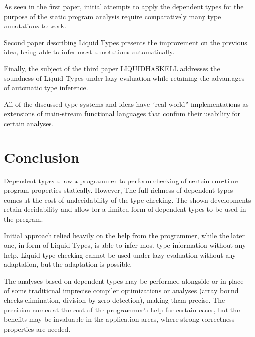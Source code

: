 \documentclass[a4paper,UKenglish]{lipics-v2016}
\begin{document}
As seen in the first paper, initial attempts to apply the dependent types for
the purpose of the static program analysis require comparatively many type
annotations to work.

Second paper describing Liquid Types presents the improvement on the previous
idea, being able to infer most annotations automatically.

Finally, the subject of the third paper LIQUIDHASKELL addresses the soundness
of Liquid Types under lazy evaluation while retaining the advantages of
automatic type inference.

All of the discussed type systems and ideas have ``real world'' implementations
as extensions of main-stream functional languages that confirm their usability
for certain analyses.

\section{Conclusion}

Dependent types allow a programmer to perform checking of certain run-time
program properties statically. However, The full richness of dependent types
comes at the cost of undecidability of the type checking. The shown
developments retain decidability and allow for a limited form of dependent
types to be used in the program.

Initial approach relied heavily on the help from the programmer, while the
later one, in form of Liquid Types, is able to infer most type information
without any help. Liquid type checking cannot be used under lazy evaluation
without any adaptation, but the adaptation is possible.

The analyses based on dependent types may be performed alongside or in place of
some traditional imprecise compiler optimizations or analyses (array bound
checks elimination, division by zero detection), making them precise. The
precision comes at the cost of the programmer's help for certain cases, but the
benefits may be invaluable in the application areas, where strong correctness
properties are needed.





\end{document}
